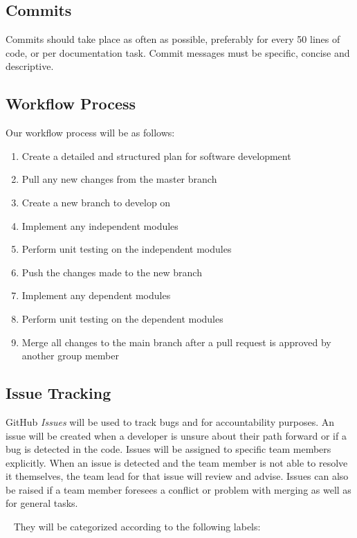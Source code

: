 \documentclass{article}
\begin{document}
\subsection{Commits}

Commits should take place as often as possible, preferably for every 50 lines of code, or per documentation task. Commit messages must be specific, concise and descriptive. 

\subsection{Workflow Process}

Our workflow process will be as follows:

\begin{enumerate}
\item Create a detailed and structured plan for software development
\item Pull any new changes from the master branch
\item Create a new branch to develop on
\item Implement any independent modules
\item Perform unit testing on the independent modules
\item Push the changes made to the new branch
\item Implement any dependent modules
\item Perform unit testing on the dependent modules
\item Merge all changes to the main branch after a pull request is approved by another group member
\end{enumerate}

\subsection{Issue Tracking}

GitHub \emph{Issues} will be used to track bugs and for accountability purposes. An issue will be created when a developer is unsure about their path forward or if a bug is detected in the code. Issues will be assigned to specific team members explicitly. When an issue is detected and the team member is not able to resolve it themselves, the team lead for that issue will review and advise. Issues can also be raised if a team member foresees a conflict or problem with merging as well as for general tasks. 

~\newline
They will be categorized according to the following labels:
\end{document}
